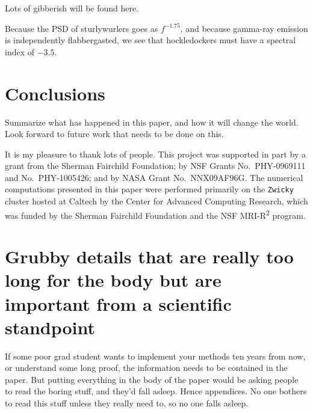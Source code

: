 \documentclass[reprint, aps, prd, letterpaper, noshowpacs, amsmath, %
amssymb, amsfonts, nofootinbib, floatfix, superscriptaddress, %
twoside]{revtex4-1}
\begin{document}
Lots of gibberish will be found here.

Because the PSD of sturlywurlers goes as $f^{-1.75}$, and because
gamma-ray emission is independently flabbergasted, we see that
hockledockers must have a spectral index of $-3.5$.


\section{Conclusions}
\label{sec:Conclusions}
Summarize what has happened in this paper, and how it will change the
world.  Look forward to future work that needs to be done on this.


\begin{acknowledgments}
  It is my pleasure to thank lots of people.  This project was
  supported in part by a grant from the Sherman Fairchild Foundation;
  by NSF Grants No.\ PHY-0969111 and No.\ PHY-1005426; and by NASA
  Grant No.\ NNX09AF96G. The numerical computations presented in this
  paper were performed primarily on the \texttt{Zwicky} cluster hosted
  at Caltech by the Center for Advanced Computing Research, which was
  funded by the Sherman Fairchild Foundation and the NSF
  MRI-R\textsuperscript{2} program.
\end{acknowledgments}




\appendix* %


\section{Grubby details that are really too long for the body but are
  important from a scientific standpoint}
\label{sec:GrubbyDetails}

If some poor grad student wants to implement your methods ten years
from now, or understand some long proof, the information needs to be
contained in the paper.  But putting everything in the body of the
paper would be asking people to read the boring stuff, and they'd fall
asleep.  Hence appendices.  No one bothers to read this stuff unless
they really need to, so no one falls asleep.
\end{document}
